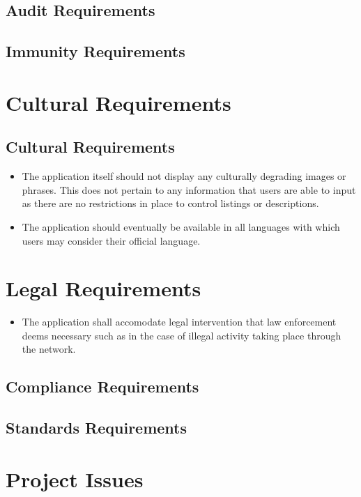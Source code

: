 \documentclass{article}
\begin{document}
\subsection{Audit Requirements}

\subsection{Immunity Requirements}


\section{Cultural Requirements}
\subsection{Cultural Requirements}

\begin{itemize}
\item
The application itself should not display any culturally degrading images or phrases. This does not pertain to any information that users are able to input as there are no restrictions in place to control listings or descriptions. 

\item
The application should eventually be available in all languages with which users may consider their official language.
\end{itemize}

\section{Legal Requirements}
\begin{itemize}
\item
The application shall accomodate legal intervention that law enforcement deems necessary such as in the case of illegal activity taking place through the network. 
\end{itemize}
\subsection{Compliance Requirements}


\subsection{Standards Requirements}


\section*{Project Issues}
\end{document}

